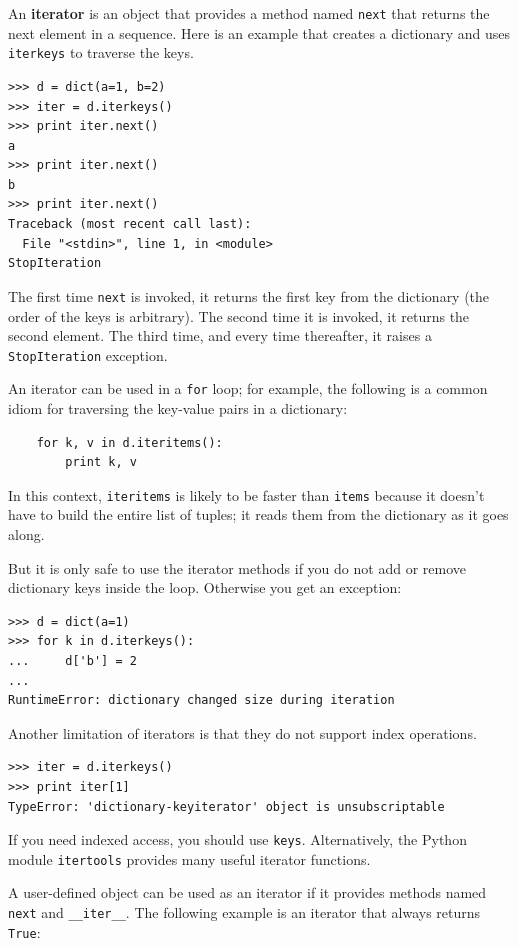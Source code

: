 \documentclass[10pt]{book}
\begin{document}
An {\bf iterator} is an object that provides a method named
{\tt next} that returns the next element in a sequence.  Here
is an example that creates a dictionary and uses {\tt iterkeys}
to traverse the keys.

\begin{verbatim}
>>> d = dict(a=1, b=2)
>>> iter = d.iterkeys()
>>> print iter.next()
a
>>> print iter.next()
b
>>> print iter.next()
Traceback (most recent call last):
  File "<stdin>", line 1, in <module>
StopIteration
\end{verbatim}

The first time {\tt next} is invoked, it returns the first key from
the dictionary (the order of the keys is arbitrary).  The second
time it is invoked, it returns the second element.  The third time,
and every time thereafter, it raises a {\tt StopIteration}
exception.

An iterator can be used in a {\tt for} loop; for example, the
following is a common idiom for traversing the key-value
pairs in a dictionary:

\begin{verbatim}
    for k, v in d.iteritems():
        print k, v
\end{verbatim}

In this context, {\tt iteritems} is likely to be faster than
{\tt items} because it doesn't have to build the entire list
of tuples; it reads them from the dictionary as it goes along.

But it is only safe to use the iterator methods if you do not add or
remove dictionary keys inside the loop.  Otherwise you get an
exception:

\begin{verbatim}
>>> d = dict(a=1)
>>> for k in d.iterkeys():
...     d['b'] = 2
...
RuntimeError: dictionary changed size during iteration
\end{verbatim}

Another limitation of iterators is that they do not support index
operations.

\begin{verbatim}
>>> iter = d.iterkeys()
>>> print iter[1]
TypeError: 'dictionary-keyiterator' object is unsubscriptable
\end{verbatim}

If you need indexed access, you should use {\tt keys}.
Alternatively, the Python module {\tt itertools} provides
many useful iterator functions.

A user-defined object can be used as an iterator if it
provides methods named {\tt next} and \verb"__iter__".
The following example is an iterator that always returns {\tt True}:
\end{document}
